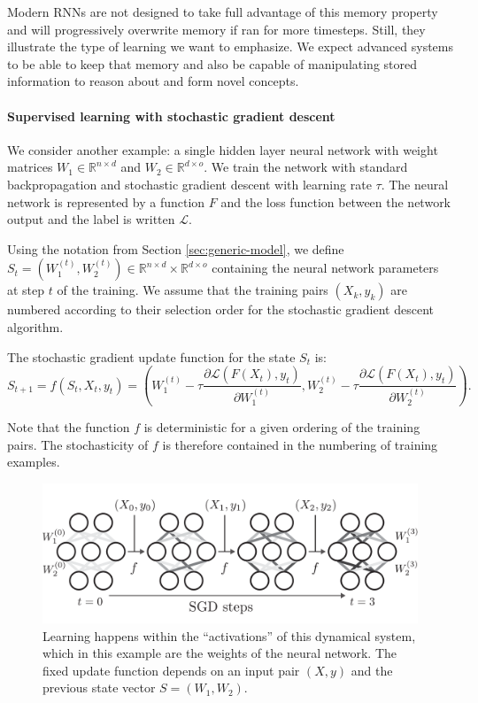 Modern \acp{RNN} are not designed to take full advantage of this memory
property and will progressively overwrite memory if ran for more timesteps.
Still, they illustrate the type of learning we want to emphasize. We expect
advanced systems to be able to keep that memory and also be capable of
manipulating stored information to reason about and form novel concepts.

\paragraph{Supervised learning with stochastic gradient descent}
\label{sec:superv-learn-with}
We consider another example: a single hidden layer neural network with weight
matrices $W_1 \in \mathbb{R}^{n \times d}$ and $W_2 \in \mathbb{R}^{d \times o}$. We train the network with
standard backpropagation and stochastic gradient descent with learning rate $\tau$.
The neural network is represented by a function $F$ and the loss function
between the network output and the label is written $\mathcal{L}$.

Using the notation from Section \ref{sec:generic-model}, we define
$S_{t} = \left(W_{1}^{(t)}, W_{2}^{(t)}\right) \in \mathbb{R}^{n \times d} \times \mathbb{R}^{d \times o}$
containing the neural network parameters at step $t$ of the training. We assume
that the training pairs $(X_{k}, y_{k})$ are numbered according to their
selection order for the stochastic gradient descent algorithm.

The stochastic gradient update function for the state $S_{t}$ is:
\begin{equation}
  \label{eq:supervised-learning}
  S_{t+1} = {f}(S_t, X_t, y_t) = \left(W_1^{(t)} - \tau \frac{\partial
      \mathcal{L}(F(X_t), y_t)}{\partial W_1^{(t)}}, W_2^{(t)} - \tau \frac{\partial
      \mathcal{L}(F(X_t), y_t)}{\partial W_2^{(t)}} \right).
\end{equation}

Note that the function $f$ is deterministic for a given ordering of the training
pairs. The stochasticity of $f$ is therefore contained in the numbering of
training examples.

\begin{figure}[ht]
  \centering
  \includegraphics[width=.9\linewidth]{figures/learning_nn.pdf}
  \caption{\label{fig:label} Learning happens within the ``activations'' of this
    dynamical system, which in this example are the weights of the neural
    network. The fixed update function depends on an input pair $(X, y)$
    and the previous state vector $S = (W_1, W_2)$.}
\end{figure}

